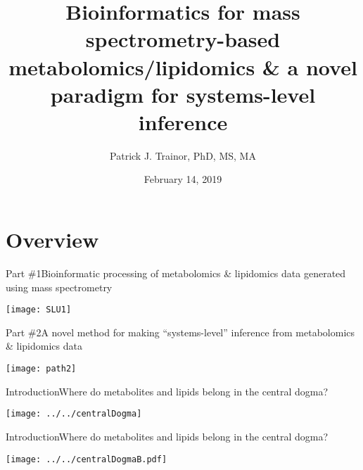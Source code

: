 \documentclass[xcolor=dvipsnames]{beamer}
\begin{document}
	
\title[Bioinformatics for MS and Systems Inference]{{\bf Bioinformatics for mass spectrometry-based metabolomics/lipidomics \& a novel paradigm for systems-level inference}}
\author[P.J. Trainor]{Patrick J. Trainor, PhD, MS, MA}
{

}
\date[February 2019]{February 14, 2019}

\begin{frame}
	\titlepage
\end{frame}

\section{Overview}

\begin{frame}{Part \#1}{Bioinformatic processing of metabolomics \& lipidomics data generated using mass spectrometry}
\vspace{-15pt}
\begin{center}
	\texttt{[image: SLU1]}
\end{center}
\end{frame}

\begin{frame}{Part \#2}{A novel method for making ``systems-level'' inference from metabolomics \& lipidomics data}
\vspace{-15pt}
\begin{center}
\texttt{[image: path2]}
\end{center}
\end{frame}

\begin{frame}{Introduction}{Where do metabolites and lipids belong in the central dogma?}
\vspace{-7 pt}
\begin{center}
		\texttt{[image: ../../centralDogma]}
	\end{center}
\end{frame}

\begin{frame}{Introduction}{Where do metabolites and lipids belong in the central dogma?}
\vspace{-7 pt}
\begin{center}
	\texttt{[image: ../../centralDogmaB.pdf]}
\end{center}
\end{frame}
\end{document}
